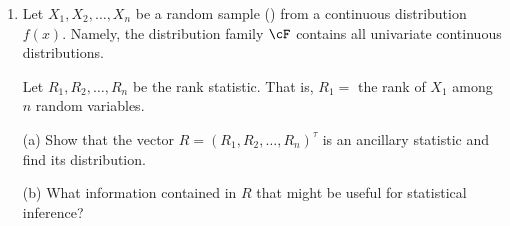 \begin{enumerate}
\item
Let $X_1, X_2, \ldots, X_n$ be a random sample (\iid)
from a continuous distribution $f(x)$. Namely, the
distribution family $\cF$ contains all univariate
continuous distributions.

Let $R_1, R_2, \ldots, R_n$ be the rank statistic.
That is, $R_1 = $ the rank of $X_1$ among $n$
random variables. 

(a) Show that the vector $R = (R_1, R_2, \ldots, R_n)^\tau$ is an 
ancillary statistic and find its distribution.

(b) What information contained in $R$ that might be
useful for statistical inference?   

%
%
%
%
%
%
%
%
%
%
%
%


\end{enumerate}
